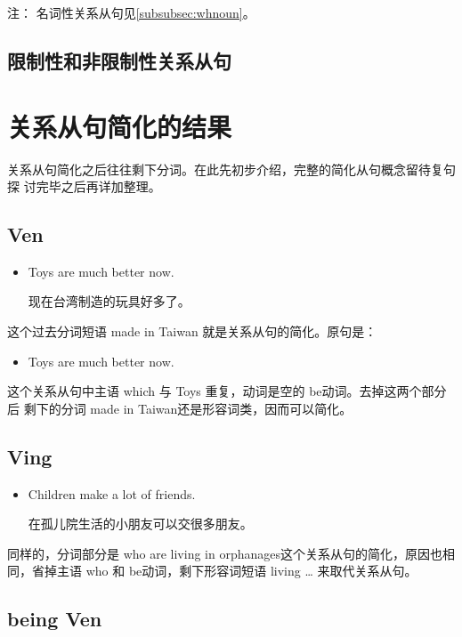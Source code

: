 注： 名词性关系从句见\cref{subsubsec:whnoun}。

\subsection{限制性和非限制性关系从句}




\section{关系从句简化的结果}

关系从句简化之后往往剩下分词。在此先初步介绍，完整的简化从句概念留待复句探
讨完毕之后再详加整理。

\subsection{Ven}

\begin{itemize}
\item  Toys  are much better now.

  现在台湾制造的玩具好多了。
\end{itemize}
这个过去分词短语 made in Taiwan 就是关系从句的简化。原句是：
\begin{itemize}
\item  Toys  are much better now.
\end{itemize}
这个关系从句中主语 which 与 Toys 重复，动词是空的 be动词。去掉这两个部分后
剩下的分词 made in Taiwan还是形容词类，因而可以简化。

\subsection{Ving}

\begin{itemize}
\item  Children  make a lot of friends.

  在孤儿院生活的小朋友可以交很多朋友。
\end{itemize}
同样的，分词部分是 who are living in orphanages这个关系从句的简化，原因也相
同，省掉主语 who 和 be动词，剩下形容词短语 living \ldots{} 来取代关系从句。

\subsection{being Ven}

